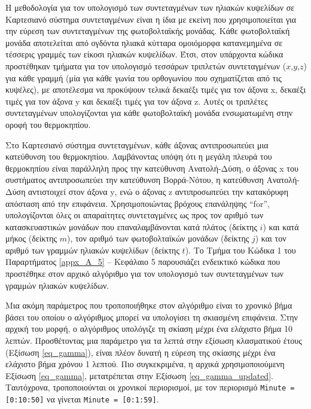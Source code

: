 \documentclass[12pt, a4paper]{report} %
\newcommand{\english}{\foreignlanguage{english}}
\begin{document}
Η μεθοδολογία για τον υπολογισμό των συντεταγμένων των ηλιακών κυψελίδων σε Καρτεσιανό σύστημα συντεταγμένων είναι η ίδια με 
εκείνη που χρησιμοποιείται για την εύρεση των συντεταγμένων της φωτοβολταϊκής μονάδας. Kάθε φωτοβολταϊκή μονάδα αποτελείται 
από ογδόντα ηλιακά κύτταρα ομοιόμορφα κατανεμημένα σε τέσσερις γραμμές των είκοσι ηλιακών κυψελίδων. Έτσι, στον υπάρχοντα κώδικα 
προστέθηκαν τμήματα για τον υπολογισμό τεσσάρων τριπλετών συντεταγμένων (\english{$x$,$y$,$z$}) για κάθε γραμμή (μία για κάθε 
γωνία του ορθογωνίου που σχηματίζεται από τις κυψέλες), με αποτέλεσμα να προκύψουν τελικά δεκαέξι τιμές για τον άξονα \english{x}, 
δεκαέξι τιμές για τον άξονα \english{y} και δεκαέξι τιμές για τον άξονα \english{z}. Αυτές οι τριπλέτες συντεταγμένων 
υπολογίζονται για κάθε φωτοβολταϊκή μονάδα ενσωματωμένη στην οροφή του θερμοκηπίου. 

Στο Καρτεσιανό σύστημα συντεταγμένων, κάθε άξονας αντιπροσωπεύει μια κατεύθυνση του θερμοκηπίου. Λαμβάνοντας υπόψη ότι η μεγάλη 
πλευρά του θερμοκηπίου είναι παράλληλη προς την κατεύθυνση Ανατολή-Δύση, ο άξονας \english{x} του συστήματος αντιπροσωπεύει την 
κατεύθυνση Βορρά-Νότου, η κατεύθυνση Ανατολή-Δύση αντιστοιχεί στον άξονα \english{y}, ενώ ο άξονας \english{z} αντιπροσωπεύει την 
κατακόρυφη απόσταση από την επιφάνεια. Χρησιμοποιώντας βρόχους επανάληψης “\english{for}”, υπολογίζονται όλες οι απαραίτητες 
συντεταγμένες ως προς τον αριθμό των κατασκευαστικών μονάδων που επαναλαμβάνονται κατά πλάτος (δείκτης \english{$i$}) και κατά 
μήκος (δείκτης \english{$m$}), τον αριθμό των φωτοβολταϊκών μονάδων (δείκτης \english{$j$}) και τον αριθμό των γραμμών ηλιακών 
κυψελίδων (δείκτης \english{$t$}). Το Τμήμα του Κώδικα 1 του Παραρτήματος \ref{appx_A_5} – Κεφάλαιο 5 παρουσιάζει ενδεικτικό 
κώδικα που προστέθηκε στον αρχικό αλγόριθμο για τον υπολογισμό των συντεταγμένων των γραμμών ηλιακών κυψελίδων.

Μια ακόμη παράμετρος που τροποποιήθηκε στον αλγόριθμο είναι το χρονικό βήμα βάσει του οποίου ο αλγόριθμος μπορεί να υπολογίσει 
τη σκιασμένη επιφάνεια. Στην αρχική του μορφή, ο αλγόριθμος υπολόγιζε τη σκίαση μέχρι ένα ελάχιστο βήμα 10 λεπτών. Προσθέτοντας 
μια παράμετρο για τα λεπτά στην εξίσωση κλασματικού έτους (Εξίσωση \ref{eq_gamma}), είναι πλέον δυνατή η εύρεση της σκίασης 
μέχρι ένα ελάχιστο βήμα χρόνου 1 λεπτού. Πιο συγκεκριμένα, η αρχικά χρησιμοποιούμενη Εξίσωση \ref{eq_gamma}, μετατρέπεται στην 
Εξίσωση \ref{eq_gamma_updated}. Ταυτόχρονα, τροποποιούνται οι χρονικοί περιορισμοί, με τον περιορισμό 
\texttt{\english{Minute = [0:10:50]}} να γίνεται \texttt{\english{Minute = [0:1:59]}}.
\end{document}
